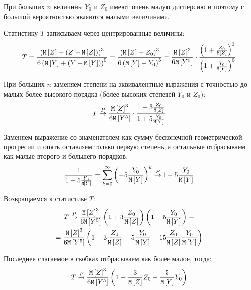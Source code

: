 При больших $n$ величины $Y_0$ и $Z_0$ имеют очень малую дисперсию и поэтому с большой вероятностью являются малыми величинами.

Статистику $T$ записываем через центрированные величины:
\begin{equation}
    T
    = \frac{\left ( \mathtt{M} \left [ Z \right ] + \left ( Z - \mathtt{M} \left [ Z \right ] \right ) \right )^3}{6 \left ( \mathtt{M} \left [ Y \right ] + \left ( Y - \mathtt{M} \left [ Y \right ] \right ) \right )^5}
    = \frac{\left ( \mathtt{M} \left [ Z \right ] + Z_0 \right )^3}{6 \left ( \mathtt{M} \left [ Y \right ] + Y_0 \right )^5}
    = \frac{\mathtt{M} \left [ Z \right ]^3}{6 \mathtt{M} \left [ Y^5 \right ]} \cdot \frac{\left ( 1 + \frac{Z_0}{\mathtt{M} \left [ Z \right ]} \right )^3}{\left ( 1 + \frac{Y_0}{\mathtt{M} \left [ Y \right ]} \right )^5}
\end{equation}

При больших $n$ заменяем степени на эквивалентные выражения с точностью до малых более высокого порядка (более высоких степеней $Y_0$ и $Z_0$):
\begin{equation}
    T \stackrel{P}{\rightarrow} \frac{\mathtt{M} \left [ Z \right ]^3}{6 \mathtt{M} \left [ Y^5 \right ]} \cdot \frac{1 + 3 \frac{Z_0}{\mathtt{M} \left [ Z \right ]}}{1 + 5 \frac{Y_0}{\mathtt{M} \left [ Y \right ]}}
\end{equation}

Заменяем выражение со знаменателем как сумму бесконечной геометрической прогресии и опять оставляем только первую степень, а остальные отбрасываем как малые второго и большего порядков:
\begin{equation}
    \frac{1}{1 + 5 \frac{Y_0}{\mathtt{M} \left [ Y \right ]}} = \sum_{k=0}^{\infty} \left ( - 5 \frac{Y_0}{\mathtt{M} \left [ Y \right ]} \right)^k \stackrel{P}{\rightarrow} 1 - 5 \frac{Y_0}{\mathtt{M} \left [ Y \right ]}
\end{equation}

Возвращаемся к статистике $T$:
\begin{multline}
    T
    \stackrel{P}{\rightarrow} \frac{\mathtt{M} \left [ Z \right ]^3}{6 \mathtt{M} \left [ Y^5 \right ]} \left ( 1 + 3 \frac{Z_0}{\mathtt{M} \left [ Z \right ]} \right ) \left ( 1 - 5 \frac{Y_0}{\mathtt{M} \left [ Y \right ]} \right ) = \\
    = \frac{\mathtt{M} \left [ Z \right ]^3}{6 \mathtt{M} \left [ Y^5 \right ]} \left ( 1 + 3 \frac{Z_0}{\mathtt{M} \left [ Z \right ]} - 5 \frac{Y_0}{\mathtt{M} \left [ Y \right ]} - 15 \frac{Z_0}{\mathtt{M} \left [ Z \right ]} \frac{Y_0}{\mathtt{M} \left [ Y \right ]} \right )
\end{multline}

Последнее слагаемое в скобках отбрасываем как более малое, тогда:
\begin{equation}
    T \stackrel{P}{\rightarrow} \frac{\mathtt{M} \left [ Z \right ]^3}{6 \mathtt{M} \left [ Y^5 \right ]} \left ( 1 + \frac{3}{\mathtt{M} \left [ Z \right ]} Z_0 - \frac{5}{\mathtt{M} \left [ Y \right ]} Y_0 \right )
\end{equation}

